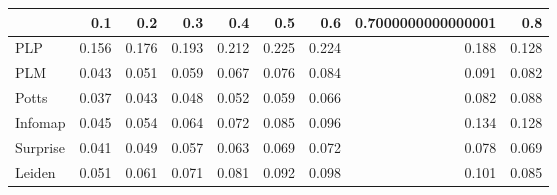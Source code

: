\begin{tabular}{lrrrrrrrr}
\toprule
{} &   0.1 &   0.2 &   0.3 &   0.4 &   0.5 &   0.6 & 0.7000000000000001 &   0.8 \\
\midrule
PLP      & 0.156 & 0.176 & 0.193 & 0.212 & 0.225 & 0.224 &              0.188 & 0.128 \\
PLM      & 0.043 & 0.051 & 0.059 & 0.067 & 0.076 & 0.084 &              0.091 & 0.082 \\
Potts    & 0.037 & 0.043 & 0.048 & 0.052 & 0.059 & 0.066 &              0.082 & 0.088 \\
Infomap  & 0.045 & 0.054 & 0.064 & 0.072 & 0.085 & 0.096 &              0.134 & 0.128 \\
Surprise & 0.041 & 0.049 & 0.057 & 0.063 & 0.069 & 0.072 &              0.078 & 0.069 \\
Leiden   & 0.051 & 0.061 & 0.071 & 0.081 & 0.092 & 0.098 &              0.101 & 0.085 \\
\bottomrule
\end{tabular}
